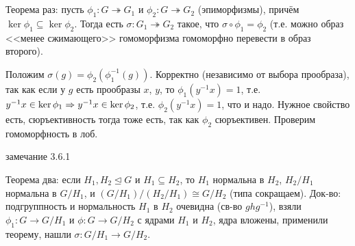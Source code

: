 \section{} %
Теорема раз:
пусть $\phi_1 \colon G \twoheadrightarrow G_1$ и
$\phi_2 \colon G \twoheadrightarrow G_2$ (эпиморфизмы),
причём $\ker \phi_1 \subseteq \ker \phi_2$.
Тогда есть $\sigma \colon G_1 \twoheadrightarrow G_2$ такое, что $\sigma \circ \phi_1 = \phi_2$
(т.е. можно образ <<менее сжимающего>> гомоморфизма гомоморфно перевести в образ второго).

Положим $\sigma(g) = \phi_2(\phi_1^{-1}(g))$.
Корректно (независимо от выбора прообраза), так как если у $g$ есть прообразы $x$, $y$,
то $\phi_1(y^{-1}x)=1$, т.е. $y^{-1}x \in \ker \phi_1 \Rightarrow y^{-1}x \in \ker \phi_2$,
т.е. $\phi_2(y^{-1}x)=1$, что и надо.
Нужное свойство есть, сюръективность тогда тоже есть, так как $\phi_2$ сюръективен.
Проверим гомоморфность в лоб.

\TODO замечание 3.6.1

Теорема два: если $H_1, H_2 \unlhd G$ и $H_1 \subseteq H_2$, то	$H_1$ нормальна в $H_2$,
$H_2 / H_1$ нормальна в $G/H_1$, и $(G/H_1)/(H_2/H_1)\cong G/H_2$ (типа сокращаем).
Док-во: подгруппность и нормальность $H_1$ в $H_2$ очевидна (св-во $ghg^{-1}$),
взяли $\phi_1 \colon G \to G/H_1$ и $\phi \colon G \to G/H_2$ с ядрами $H_1$ и $H_2$,
ядра вложены, применили теорему, нашли $\sigma \colon G/H_1 \to G/H_2$.
\TODO
